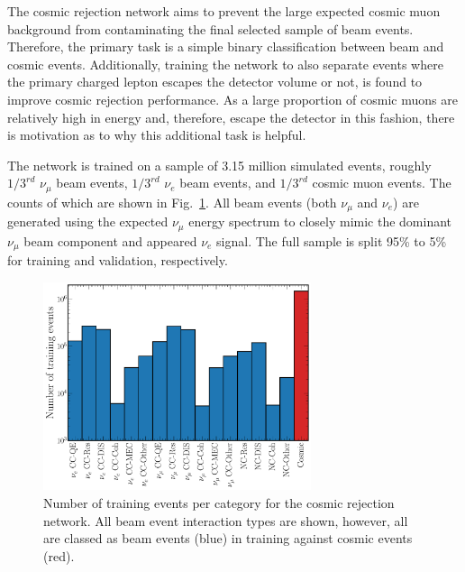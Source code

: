 The cosmic rejection network aims to prevent the large expected cosmic muon background from
contaminating the final selected sample of beam events. Therefore, the primary task is a simple
binary classification between beam and cosmic events. Additionally, training the network to also
separate events where the primary charged lepton escapes the detector volume or not, is found to
improve cosmic rejection performance. As a large proportion of cosmic muons are relatively high in
energy and, therefore, escape the detector in this fashion, there is motivation as to why this
additional task is helpful.

The network is trained on a sample of 3.15 million simulated events, roughly $1/3^{rd}$
$\nu_{\mu}$ beam events, $1/3^{rd}$ $\nu_{e}$ beam events, and $1/3^{rd}$ cosmic muon events. The
counts of which are shown in Fig.~\ref{fig:cosmic_training_sample}. All beam events (both
$\nu_{\mu}$ and $\nu_{e}$) are generated using the expected \chips $\nu_{\mu}$ energy spectrum to
closely mimic the dominant $\nu_{\mu}$ beam component and appeared $\nu_{e}$ signal. The full
sample is split 95\% to 5\% for training and validation, respectively.

\begin{figure} %
    \includegraphics[width=0.7\textwidth]{diagrams/6-cvn/chipsnet/explore_cosmic_training_sample.pdf}
    \caption[Number of training events per category for the cosmic rejection network.]
    {Number of training events per category for the cosmic rejection network. All beam event
        interaction types are shown, however, all are classed as beam events (blue) in training
        against cosmic events (red).}
    \label{fig:cosmic_training_sample}
\end{figure}

